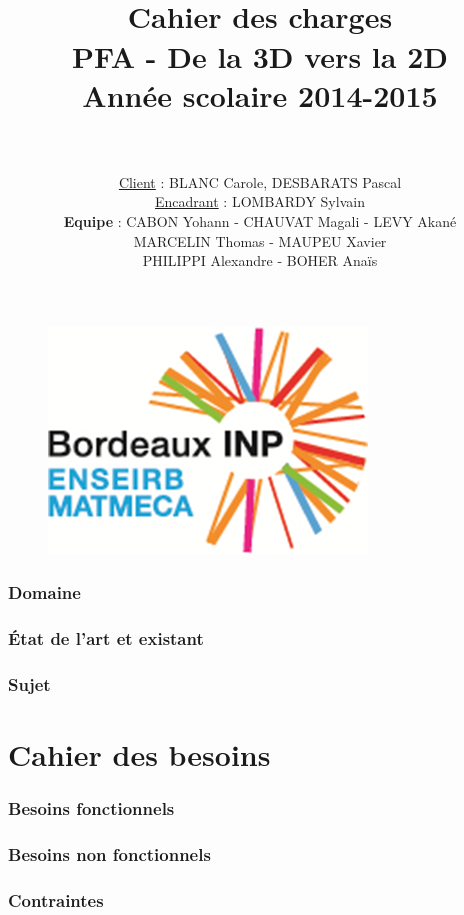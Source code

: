\documentclass[paper=a4, fontsize=11pt]{article}
\title{
		\usefont{OT1}{bch}{b}{n}
		\horrule{1.5pt} \\[0.5cm]	
		\Huge \textbf{Cahier des charges} \\ [10pt]
		\Huge PFA - De la 3D vers la 2D \\ [15pt]
		\LARGE Année scolaire 2014-2015 \\ 
		\horrule{1.5pt} \\[0.5cm]
}
\author{
		\huge \underline{Client} : \LARGE BLANC Carole, DESBARATS Pascal\\ [10pt] 
		\huge \underline{Encadrant} : \LARGE LOMBARDY Sylvain\\[20pt]
				\normalfont 							
        \huge \textbf{Equipe} : \Large CABON Yohann - CHAUVAT Magali - LEVY Akané \\[5pt]
        MARCELIN Thomas - MAUPEU Xavier\\[5pt]
        PHILIPPI Alexandre - BOHER Anaïs\\[10pt]		\normalsize
}
\date{}
\numberwithin{equation}{section}		%
\numberwithin{figure}{section}			%
\numberwithin{table}{section}				%
\begin{document}
\maketitle

\begin{figure}[b]
\centering\includegraphics{logo.png}
\end{figure}

\newpage

\tableofcontents

\newpage

\section{Domaine}


\section{État de l'art et existant}


\section{Sujet}


\part*{Cahier des besoins}
\section{Besoins fonctionnels}

\section{Besoins non fonctionnels}

\section{Contraintes}

\end{document}
